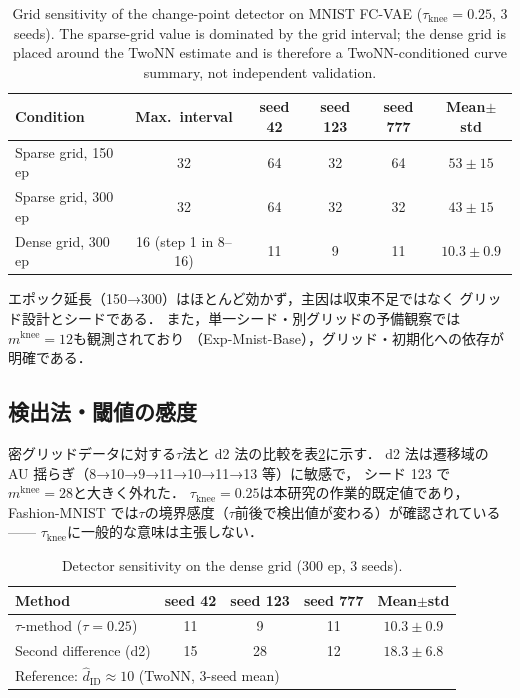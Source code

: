 \documentclass[11pt,a4paper]{jsarticle}
\newcommand{\hatdID}{\hat{d}_{\mathrm{ID}}}
\newcommand{\mknee}{m^{\mathrm{knee}}}
\begin{document}
\begin{table}[H]
\centering
\caption{Grid sensitivity of the change-point detector on MNIST FC-VAE
($\tau_{\mathrm{knee}} = 0.25$, 3 seeds). The sparse-grid value is dominated
by the grid interval; the dense grid is placed around the TwoNN estimate and
is therefore a TwoNN-conditioned curve summary, not independent validation.}
\label{tab:knee_grid}
\small
\begin{tabular}{lccccc}
\toprule
Condition & Max.\ interval & seed 42 & seed 123 & seed 777 & Mean$\pm$std \\
\midrule
Sparse grid, 150 ep & 32 & 64 & 32 & 64 & $53 \pm 15$ \\
Sparse grid, 300 ep & 32 & 64 & 32 & 32 & $43 \pm 15$ \\
Dense grid, 300 ep & 16 (step 1 in 8--16) & 11 & 9 & 11 & $10.3 \pm 0.9$ \\
\bottomrule
\end{tabular}
\end{table}

エポック延長（150→300）はほとんど効かず，主因は収束不足ではなく
グリッド設計とシードである．
また，単一シード・別グリッドの予備観察では$\mknee = 12$も観測されており
（Exp-Mnist-Base），グリッド・初期化への依存が明確である．

\subsection{検出法・閾値の感度}

密グリッドデータに対する$\tau$法と d2 法の比較を表\ref{tab:knee_method}に示す．
d2 法は遷移域の AU 揺らぎ（8→10→9→11→10→11→13 等）に敏感で，
シード 123 で$\mknee = 28$と大きく外れた．
$\tau_{\mathrm{knee}} = 0.25$は本研究の作業的既定値であり，
Fashion-MNIST では$\tau$の境界感度（$\tau$前後で検出値が変わる）が確認されている——
$\tau_{\mathrm{knee}}$に一般的な意味は主張しない．

\begin{table}[H]
\centering
\caption{Detector sensitivity on the dense grid (300 ep, 3 seeds).}
\label{tab:knee_method}
\small
\begin{tabular}{lcccc}
\toprule
Method & seed 42 & seed 123 & seed 777 & Mean$\pm$std \\
\midrule
$\tau$-method ($\tau = 0.25$) & 11 & 9 & 11 & $10.3 \pm 0.9$ \\
Second difference (d2) & 15 & 28 & 12 & $18.3 \pm 6.8$ \\
\midrule
\multicolumn{5}{l}{Reference: $\hatdID \approx 10$ (TwoNN, 3-seed mean)} \\
\bottomrule
\end{tabular}
\end{table}
\end{document}

